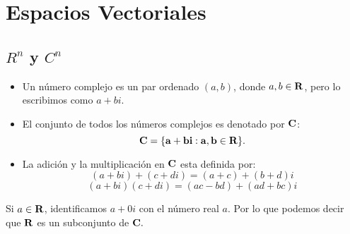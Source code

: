 \chapter{Espacios Vectoriales}

\section{\boldmath $R^n$ y $C^n$}

\begin{tcolorbox}[colback=white]
    \begin{def.} \hfill
	\begin{itemize}
	    \item Un número complejo es un par ordenado $(a,b)$, donde $a,b\in \bf{R}$, pero lo escribimos como $a+bi$.
	    \item El conjunto de todos los números complejos es denotado por $\bf{C}$:
		$$\bf{C}=\lbrace a+bi:a,b\in \bf{R}\rbrace.$$

	    \item La adición y la multiplicación en $\bf{C}$ esta definida por:
		$$(a+bi)+(c+di)=(a+c)+(b+d)i$$
		$$(a+bi)(c+di)=(ac-bd)+(ad+bc)i$$
	\end{itemize}
    \end{def.}
\end{tcolorbox}

Si $a\in \bf{R}$, identificamos $a+0i$ con el número real $a$. Por lo que podemos decir que $\bf{R}$ es un subconjunto de $\bf{C}.$

